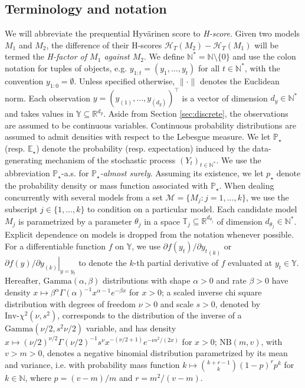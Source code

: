 \documentclass[12pt]{article}
\theoremstyle{plain}
\theoremstyle{definition}
\begin{document}
	\subsection{Terminology and notation}
	We will abbreviate the prequential Hyv{\"a}rinen score to \emph{H-score}.
	Given two models $M_1$ and
	$M_2$, the difference of their H-scores $\mathcal{H}_T(M_2)-\mathcal{H}_T(M_1)$
	will be termed the \emph{H-factor of $M_1$ against $M_2$}. 
	We define
	$\mathbb{N}^*=\mathbb{N}\setminus\{0\}$ and use the colon notation for tuples of
	objects, e.g.\! $y_{1:t} = (y_1,...,y_t)$ for all $t\in\mathbb{N}^*$, with the
	convention $y_{1:0}= \emptyset$. Unless specified otherwise, $\|\cdot\|$ 
	denotes the Euclidean norm. Each observation $y=(y_{(1)},...,y_{(d_y)})^\top$ is a vector of dimension $d_y\in\mathbb{N}^*$ and takes
	values in $\mathbb{Y}\subseteq\mathbb{R}^{d_y}$.
	Aside from Section \ref{sec:discrete}, the observations are assumed to be continuous variables. Continuous probability distributions 
	are assumed to admit densities with respect to the Lebesgue measure. 
	We let $\mathbb{P}_\star$ (resp.\! $\mathbb{E}_\star$) denote the probability (resp.\! expectation) induced by the
	data-generating mechanism of the stochastic process $(Y_t)_{t\in\mathbb{N}^*}$. We use the abbreviation $\mathbb{P}_\star$-a.s.\! for \emph{$\mathbb{P}_\star$-almost surely}.
	Assuming its existence, we let $p_\star$ denote the
	probability density or mass function associated with $\mathbb{P}_\star$. 
	When dealing concurrently with several models from a
	set $\mathcal{M}=\{M_j: j=1,...,k\}$, we use the subscript $j\in\{1,...,k\}$ to condition on a
	particular model. Each candidate model $M_j$ is parametrized by a parameter
	$\theta_j$ in a space $\mathbb{T}_j\subseteq\mathbb{R}^{d_{\theta_j}}$
	of dimension ${d_{\theta_j}}\in\mathbb{N}^*$. Explicit dependence on models
	is dropped from the notation whenever possible. 
	For a differentiable function $f$ on $\mathbb{Y}$, we use
	${\partial f(y_t)}/\partial {y_t}_{(k)}$ or $\left.{\partial f(y)}/\partial
	{y}_{(k)}\right|_{y=y_t}$ to denote the $k$-th partial
	derivative of $f$ evaluated at $y_t\in\mathbb{Y}$. 
	Hereafter, $\text{Gamma}(\alpha,\beta)$ distributions with shape $\alpha>0$ and rate
	$\beta>0$ have density $x\mapsto \beta^\alpha
	\Gamma(\alpha)^{-1}x^{\alpha-1}e^{-\beta x}$ for $x>0$; 
	a scaled inverse chi
	square distribution with degrees of freedom $\nu>0$ and scale $s>0$, denoted by
	$\text{Inv-}\chi^2(\nu,s^2)$, corresponds to the distribution of the inverse of
	a $\text{Gamma}(\nu/2,s^2\nu/2)$ variable, and has density $x\mapsto
	(\nu/2)^{\nu/2}\Gamma(\nu/2)^{-1}s^\nu x^{-(\nu/2+1)}e^{-\nu s^2/(2x)}$ for
	$x>0$; 
	$\text{NB}(m,v)$, with $v > m >0$, 
	denotes a negative binomial distribution parametrized by its mean and variance,
	i.e. with probability mass function $k\mapsto \binom{k+r-1}{k}(1-p)^r p^k$ for
	$k\in\mathbb{N}$, where $p = (v-m)/m$ and $r = m^2/(v-m)$.
	
\end{document}
